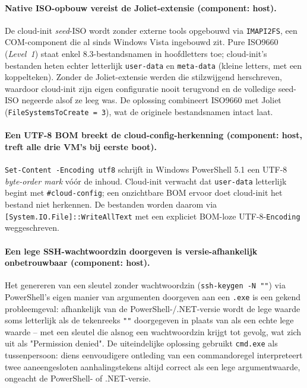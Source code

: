 \paragraph{Native ISO-opbouw vereist de Joliet-extensie (component: host).} De cloud-init
\textit{seed}-ISO wordt zonder externe tools opgebouwd via \texttt{IMAPI2FS}, een
COM-component die al sinds Windows Vista ingebouwd zit. Pure ISO9660 (\textit{Level~1})
staat enkel 8.3-bestandsnamen in hoofdletters toe; cloud-init's bestanden heten echter
letterlijk \texttt{user-data} en \texttt{meta-data} (kleine letters, met een
koppelteken). Zonder de Joliet-extensie werden die stilzwijgend herschreven, waardoor
cloud-init zijn eigen configuratie nooit terugvond en de volledige seed-ISO negeerde
alsof ze leeg was. De oplossing combineert ISO9660 met Joliet
(\texttt{FileSystemsToCreate = 3}), wat de originele bestandsnamen intact laat.

\paragraph{Een UTF-8 BOM breekt de cloud-config-herkenning (component: host, treft alle
drie VM's bij eerste boot).} \texttt{Set-Content -Encoding utf8} schrijft in Windows
PowerShell 5.1 een UTF-8 \textit{byte-order mark} vóór de inhoud. Cloud-init verwacht dat
\texttt{user-data} letterlijk begint met \texttt{\#cloud-config}; een onzichtbare BOM
ervoor doet cloud-init het bestand niet herkennen. De bestanden worden daarom via
\texttt{[System.IO.File]::WriteAllText} met een expliciet BOM-loze
UTF-8-\texttt{Encoding} weggeschreven.

\paragraph{Een lege SSH-wachtwoordzin doorgeven is versie-afhankelijk onbetrouwbaar
(component: host).} Het genereren van een sleutel zonder wachtwoordzin
(\texttt{ssh-keygen -N ""}) via PowerShell's eigen manier van argumenten doorgeven aan
een \texttt{.exe} is een gekend probleemgeval: afhankelijk van de PowerShell-/.NET-versie
wordt de lege waarde soms letterlijk als de tekenreeks \texttt{""} doorgegeven in plaats
van als een echte lege waarde -- met een sleutel die alsnog een wachtwoordzin krijgt tot
gevolg, wat zich uit als "Permission denied". De uiteindelijke oplossing gebruikt
\texttt{cmd.exe} als tussenpersoon: diens eenvoudigere ontleding van een commandoregel
interpreteert twee aaneengesloten aanhalingstekens altijd correct als een lege
argumentwaarde, ongeacht de PowerShell- of .NET-versie.

